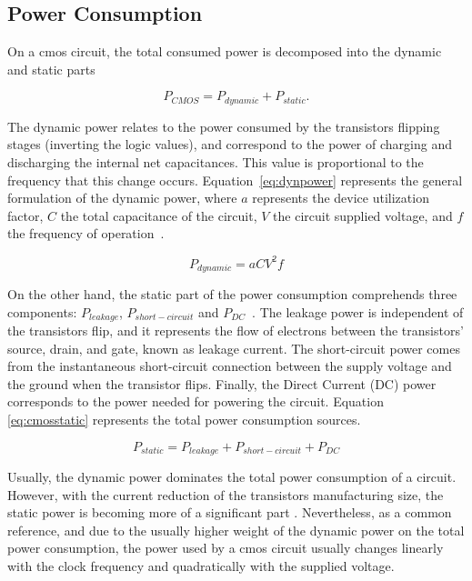 \subsection{Power Consumption}
\label{sec:power_consumption}
On a \acrshort{cmos} circuit, the total consumed power is decomposed into the dynamic and static parts

\begin{equation}
    P_{CMOS} = P_{dynamic} + P_{static}.
    \label{eq:power}
\end{equation}

The dynamic power relates to the power consumed by the transistors flipping stages (inverting the logic values), and correspond to the power of charging and discharging the internal net capacitances. This value is proportional to the frequency that this change occurs. Equation~\ref{eq:dynpower} represents the general formulation of the dynamic power, where $a$ represents the device utilization factor, $C$ the total capacitance of the circuit, $V$ the circuit supplied voltage, and $f$ the frequency of operation~\cite{gonzalez_supply_1997}.

\begin{equation}
    P_{dynamic} = aCV^2f
    \label{eq:dynpower}
\end{equation}

On the other hand, the static part of the power consumption comprehends three components: $P_{leakage}$, $P_{short-circuit}$ and $P_{DC}$~\cite{mei_survey_2016}. The leakage power is independent of the transistors flip, and it represents the flow of electrons between the transistors' source, drain, and gate, known as leakage current. The short-circuit power comes from the instantaneous short-circuit connection between the supply voltage and the ground when the transistor flips. Finally, the Direct Current (DC) power corresponds to the power needed for powering the circuit. Equation \ref{eq:cmosstatic} represents the total power consumption sources.

\begin{equation}
    P_{static} = P_{leakage} + P_{short-circuit} + P_{DC}
    \label{eq:cmosstatic}
\end{equation}

Usually, the dynamic power dominates the total power consumption of a circuit. However, with the current reduction of the transistors manufacturing size, the static power is becoming more of a significant part \cite{s._hong_modeling_2012,hong_integrated_2010}. Nevertheless, as a common reference, and due to the usually higher weight of the dynamic power on the total power consumption, the power used by a \acrshort{cmos} circuit usually changes linearly with the clock frequency and quadratically with the supplied voltage.


